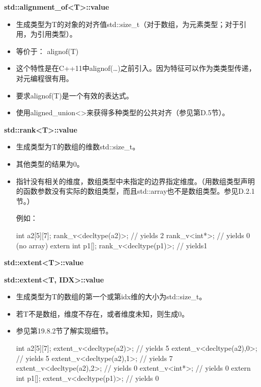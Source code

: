 \textbf{std::alignment\_of<T>::value}

\begin{itemize}
\item 
生成类型为T的对象的对齐值std::size\_t（对于数组，为元素类型；对于引用，为引用类型）。

\item 
等价于： alignof(T)

\item 
这个特性是在C++11中alignof(…)之前引入。因为特征可以作为类类型传递，对元编程很有用。

\item 
要求alignof(T)是一个有效的表达式。

\item 
使用aligned\_union<>来获得多种类型的公共对齐（参见第D.5节）。
\end{itemize}

\textbf{std::rank<T>::value}

\begin{itemize}
\item 
生成类型为T的数组的维数std::size\_t。

\item 
其他类型的结果为0。

\item 
指针没有相关的维度，数组类型中未指定的边界指定维度。（用数组类型声明的函数参数没有实际的数组类型，而且std::array也不是数组类型。参见D.2.1节。）

例如：
\begin{cpp}
int a2[5][7];
rank_v<decltype(a2)>; // yields 2
rank_v<int*>; // yields 0 (no array)
extern int p1[];
rank_v<decltype(p1)>; // yields1
\end{cpp}
\end{itemize}

\textbf{std::extent<T>::value}

\textbf{std::extent<T, IDX>::value}

\begin{itemize}
\item 
生成类型为T的数组的第一个或第idx维的大小为std::size\_t。

\item 
若T不是数组，维度不存在，或者维度未知，则生成0。

\item 
参见第19.8.2节了解实现细节。

\begin{cpp}
int a2[5][7];
extent_v<decltype(a2)>; // yields 5
extent_v<decltype(a2),0>; // yields 5
extent_v<decltype(a2),1>; // yields 7
extent_v<decltype(a2),2>; // yields 0
extent_v<int*>; // yields 0
extern int p1[];
extent_v<decltype(p1)>; // yields 0
\end{cpp}
\end{itemize}

